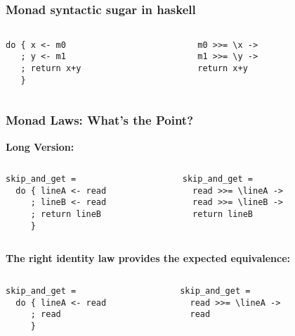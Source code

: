 \documentclass{beamer}
\begin{document}
\subsection{} 
\begin{frame}[fragile]
\frametitle{Monad syntactic sugar in haskell}
\begin{columns}[t]
  \begin{column}{5cm}
\begin{lstlisting}
do { x <- m0
   ; y <- m1
   ; return x+y
   }
\end{lstlisting}
  \end{column}
  \begin{column}{5cm}
\begin{lstlisting}
    m0 >>= \x ->    
    m1 >>= \y ->    
    return x+y
\end{lstlisting}
  \end{column}
\end{columns}



\end{frame}
\begin{frame}[fragile]
\frametitle{Monad Laws: What's the Point?}		
\textbf{Long Version:}
\vspace{-0.5cm}
\begin{columns}[t]
  \begin{column}{5cm}
\begin{lstlisting}
skip_and_get = 
  do { lineA <- read
     ; lineB <- read 
     ; return lineB 
     }
\end{lstlisting}
  \end{column}
  \begin{column}{5cm}
\begin{lstlisting}
skip_and_get =
  read >>= \lineA ->    
  read >>= \lineB ->    
  return lineB
\end{lstlisting}
  \end{column}
\end{columns}
\pause
\textbf{The right identity law provides the expected equivalence:} 
\vspace{-0.5cm}
\begin{columns}[t]
  \begin{column}{5cm}
\begin{lstlisting}
skip_and_get = 
  do { lineA <- read
     ; read
     }
\end{lstlisting}
  \end{column}
  \begin{column}{5cm}
\begin{lstlisting}
skip_and_get =
  read >>= \lineA ->    
  read
\end{lstlisting}
  \end{column}
\end{columns}
\end{frame}
\end{document}
